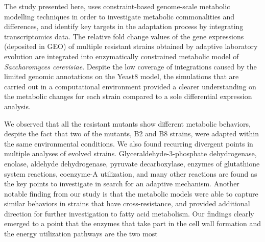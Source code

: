 The study presented here, uses constraint-based genome-scale metabolic modelling techniques in order to investigate metabolic commonalities and differences, and identify key targets in the adaptation process by integrating transcriptomics data. The relative fold change values of the gene expressions (deposited in GEO) of multiple resistant strains obtained by adaptive laboratory evolution are integrated into enzymatically constrained metabolic model of \emph{Saccharomyces cerevisiae}. Despite the low coverage of integrations caused by the limited genomic annotations on the Yeast8 model, the simulations that are carried out in a computational environment provided a clearer understanding on the metabolic changes for each strain compared to a sole differential expression analysis.

We observed that all the resistant mutants show different metabolic behaviors, despite the fact that two of the mutants, B2 and B8 strains, were adapted within the same environmental conditions. We also found recurring divergent points in multiple analyses of evolved strains. Glyceraldehyde-3-phosphate dehydrogenase, enolase, aldehyde dehydrogenase, pyruvate decarboxylase, enzymes of glutathione system reactions, coenzyme-A utilization, and many other reactions are found as the key points to investigate in search for an adaptive mechanism. Another notable finding from our study is that the metabolic models were able to capture similar behaviors in strains that have cross-resistance, and provided additional direction for further investigation to fatty acid metabolism. Our findings clearly emerged to a point that the enzymes that take part in the cell wall formation and the energy utilization pathways are the two most
